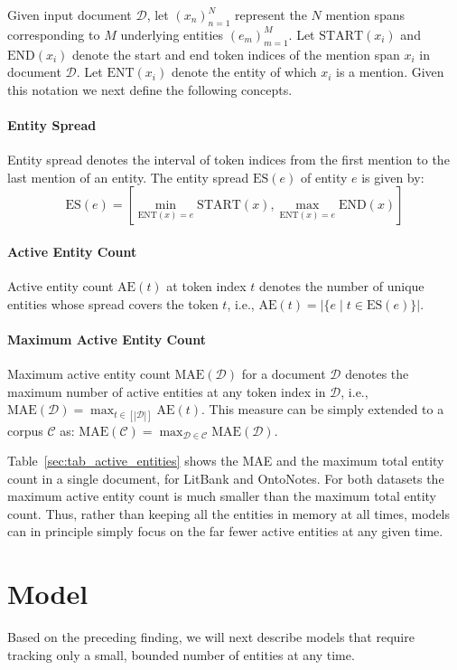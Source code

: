 \documentclass[11pt,a4paper]{article}
\begin{document}
\label{sec:active}
Given input document $\mathcal{D}$, let $(x_n)_{n=1}^N$ represent the $N$ mention spans corresponding to $M$ underlying entities $(e_m)_{m=1}^M$. Let $\textrm{START}(x_i)$ and $\textrm{END}(x_i)$ denote the start and end token indices of the mention span $x_i$ in document $\mathcal{D}$.
Let $\textrm{ENT}(x_i)$ denote the entity of which $x_i$ is a mention.
Given this notation we next define the following concepts.


\paragraph{Entity Spread} Entity spread denotes the interval of token indices from the first mention to the last mention of an entity. The entity spread $\textrm{ES}(e)$ of entity $e$ is given by: $$\textrm{ES}(e) = [\min_{\textrm{ENT}(x) = e}\textrm{START}(x), \max_{\textrm{ENT}(x) = e}\textrm{END}(x)]$$


\paragraph{Active Entity Count}
Active entity count $\textrm{AE}(t)$ at token index $t$  denotes the number of unique entities whose spread covers the token $t$, i.e.,
$\textrm{AE}(t) = |\{e \;|\; t \in \textrm{ES}(e) \}|$.

\paragraph{Maximum Active Entity Count}
Maximum active entity count $\textrm{MAE}(\mathcal{D})$ for a document $\mathcal{D}$ denotes the maximum number of active entities at any token index in $\mathcal{D}$, i.e.,
$\textrm{MAE}(\mathcal{D}) = \max_{t \in [|\mathcal{D}|]} \textrm{AE}(t)$. 
This measure can be simply extended to a corpus $\mathcal{C}$ as: $\textrm{MAE}(\mathcal{C}) = \max_{\mathcal{D} \in \mathcal{C}} \textrm{MAE}(\mathcal{D})$. 

Table~\ref{sec:tab_active_entities} shows the MAE and the maximum total entity count in a single document,
 for LitBank and OntoNotes. For both datasets the maximum active entity count is much smaller than the maximum total entity count.
Thus, rather than keeping all the entities in memory at all times, models can in principle simply focus on the far fewer active entities at any given time.

  \section{Model}
Based on the preceding finding, we will next describe models that require tracking only a small, bounded number of entities at any time.
\end{document}
